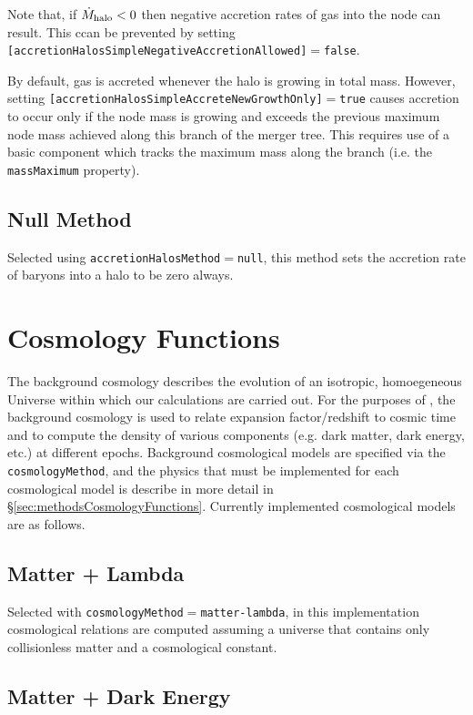 Note that, if $\dot{M}_{\rm halo} < 0$ then negative accretion rates of gas into the node can result. This ccan be prevented by setting {\tt [accretionHalosSimpleNegativeAccretionAllowed]}$=${\tt false}.

By default, gas is accreted whenever the halo is growing in total mass. However, setting {\tt [accretionHalosSimpleAccreteNewGrowthOnly]}$=${\tt true} causes accretion to occur only if the node mass is growing and exceeds the previous maximum node mass achieved along this branch of the merger tree. This requires use of a basic component which tracks the maximum mass along the branch (i.e. the {\tt massMaximum} property).

\subsection{Null Method}

Selected using {\tt accretionHalosMethod}$=${\tt null}, this method sets the accretion rate of baryons into a halo to be zero always.

\section{Cosmology Functions}

The background cosmology describes the evolution of an isotropic, homoegeneous Universe within which our calculations are carried out. For the purposes of \glc, the background cosmology is used to relate expansion factor/redshift to cosmic time and to compute the density of various components (e.g. dark matter, dark energy, etc.) at different epochs. Background cosmological models are specified via the {\tt cosmologyMethod}, and the physics that must be implemented for each cosmological model is describe in more detail in \S\ref{sec:methodsCosmologyFunctions}. Currently implemented cosmological models are as follows.

\subsection{Matter + Lambda}\label{phys:cosmologyFunctions:cosmologyFunctionsMatterLambda}

Selected with {\tt cosmologyMethod}$=${\tt matter-lambda}, in this implementation cosmological relations are computed assuming a universe that contains only collisionless matter and a cosmological constant.

\subsection{Matter + Dark Energy}\label{phys:cosmologyFunctions:cosmologyFunctionsMatterDarkEnergy}

